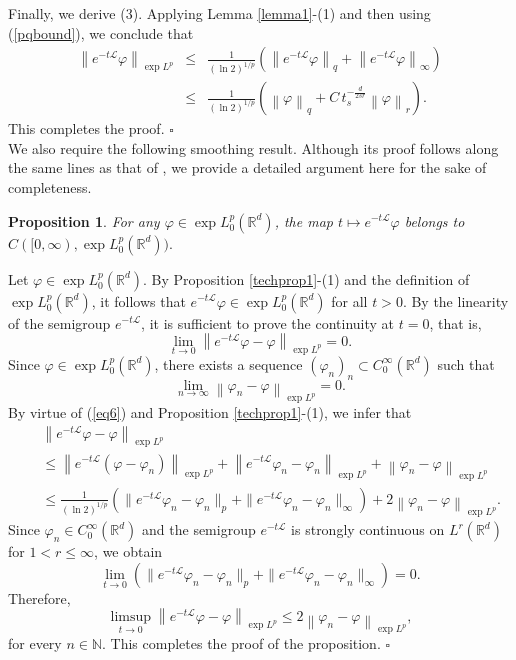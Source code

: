 \documentclass[a4paper,11pt]{amsart}
\renewcommand\eqref[1]{(\ref{#1})} %
\numberwithin{equation}{section}
\theoremstyle{plain}
\newtheorem{proposition}{Proposition}
\theoremstyle{definition}
\begin{document}
Finally, we derive (3). Applying Lemma \ref{lemma1}-(1) and then using \eqref{pqbound}, we conclude that
\begin{eqnarray*}
\left\|e^{-t \mathcal{L}} \varphi\right\|_{\exp L^p}&\leq&\frac{1}{(\ln 2)^{1/p}}\left(\left\|e^{-t\mathcal{L}} \varphi\right\|_q+\left\|e^{-t\mathcal{L}} \varphi\right\|_\infty\right)\\
&\leq&\frac{1}{(\ln 2)^{1/p}}\left(\left\| \varphi\right\|_q+C\,t_s^{-\frac{d}{2s r}}\left\| \varphi\right\|_r\right).
\end{eqnarray*}
This completes the proof. \hfill$\square$\\

We also require the following smoothing result. Although its proof follows along the same lines as that of \cite[Proposition~3.7]{Majdoub1}, we provide a detailed argument here for the sake of completeness.


\begin{proposition}\label{prop2}
For any $\varphi\in \exp L^p_0(\mathbb{R}^d)$, the map $t\mapsto e^{-t\mathcal{L}}\varphi$ belongs to $C([0,\infty),\exp L^p_0(\mathbb{R}^d)).$
\end{proposition}
\proof 
   Let $\varphi\in \exp L^p_0(\mathbb{R}^d)$. By Proposition \ref{techprop1}-(1) and the definition of $\exp L^p_0(\mathbb{R}^d)$, it follows that $e^{-t\mathcal{L}}\varphi\in \exp L^p_0(\mathbb{R}^d)$ for all $t>0$. By the linearity of the semigroup $e^{-t\mathcal{L}}$, it is sufficient to prove the continuity at $t=0$, that is,
$$
\lim_{t\rightarrow 0}\left\|e^{-t\mathcal{L}} \varphi-\varphi\right\|_{\exp L^p}=0.
$$ Since $\varphi\in \exp L^p_0(\mathbb{R}^d)$, there exists a sequence $(\varphi_n)_n\subset C^\infty_0(\mathbb{R}^d)$ such that
$$
\lim_{n\rightarrow \infty}\left\|\varphi_n-\varphi\right\|_{\exp L^p}=0.
$$
By virtue of (\ref{eq6}) and Proposition \ref{techprop1}-(1), we infer that
\begin{eqnarray*}
&{}&\left\|e^{-t\mathcal{L}} \varphi-\varphi\right\|_{\exp L^p}\\
&{}&\leq\left\|e^{-t\mathcal{L}} (\varphi-\varphi_n)\right\|_{\exp L^p}+\left\|e^{-t\mathcal{L}} \varphi_n-\varphi_n\right\|_{\exp L^p}+\left\|\varphi_n-\varphi\right\|_{\exp L^p}\\
&{}&\leq\frac{1}{(\ln 2)^{1/p}}\left(\|e^{-t\mathcal{L}} \varphi_n-\varphi_n\|_p+\|e^{-t\mathcal{L}} \varphi_n-\varphi_n\|_\infty\right)
+2\left\|\varphi_n-\varphi\right\|_{\exp L^p}.
\end{eqnarray*}
Since $\varphi_n\in C^\infty_0(\mathbb{R}^d)$ and the semigroup $e^{-t\mathcal{L}}$ is  strongly continuous on $L^r(\mathbb{R}^d)$ for $1<r\leq\infty$, we obtain
$$
\lim_{t\rightarrow 0}\left(\|e^{-t\mathcal{L}} \varphi_n-\varphi_n\|_p+\|e^{-t\mathcal{L}} \varphi_n-\varphi_n\|_\infty\right)=0.
$$
Therefore,
$$
\limsup_{t\rightarrow 0}\left\|e^{-t\mathcal{L}} \varphi-\varphi\right\|_{\exp L^p}
\leq 2\left\|\varphi_n-\varphi\right\|_{\exp L^p},
$$
for every $n\in\mathbb{N}$. This completes the proof of the proposition. 
\hfill$\square$\\
\end{document}
